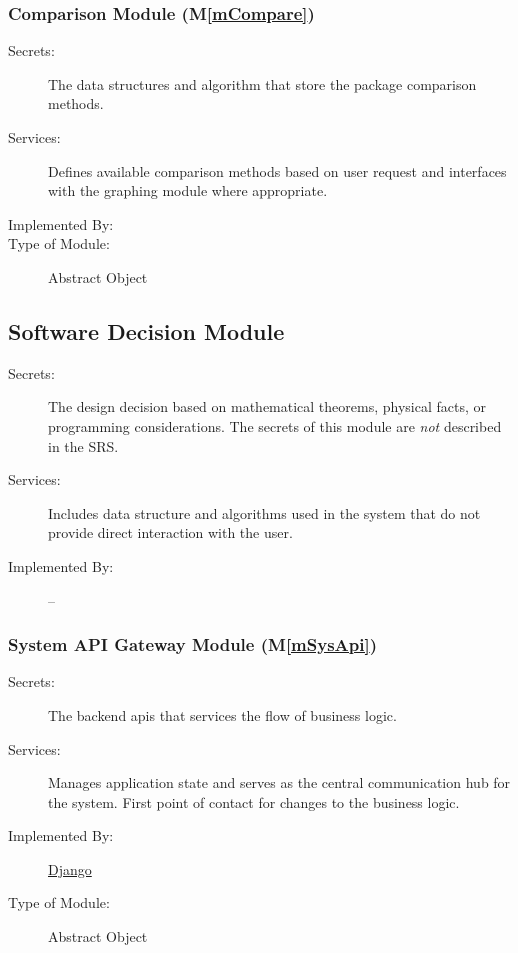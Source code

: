 \documentclass[12pt, titlepage]{article}
\newcommand{\mref}[1]{M\ref{#1}}
\begin{document}
\subsubsection{Comparison Module (\mref{mCompare})}
\begin{description}
\item[Secrets:] The data structures and algorithm that store the package comparison methods.
\item[Services:] Defines available comparison methods based on user request and interfaces with the graphing module where appropriate.
\item[Implemented By:] \projname
\item[Type of Module:] Abstract Object
\end{description}

\subsection{Software Decision Module}
\begin{description}
\item[Secrets:] The design decision based on mathematical theorems, physical
  facts, or programming considerations. The secrets of this module are
  \emph{not} described in the SRS.
\item[Services:] Includes data structure and algorithms used in the system that
  do not provide direct interaction with the user.
\item[Implemented By:] --
\end{description}

\subsubsection{System API Gateway Module (\mref{mSysApi})}
\begin{description}
\item[Secrets:] The backend apis that services the flow of business logic.
\item[Services:] Manages application state and serves as the central communication hub for the system. First point of contact for changes to the business logic.
\item[Implemented By:] \href{https://www.djangoproject.com/}{Django}
\item[Type of Module:] Abstract Object
\end{description}
\end{document}
